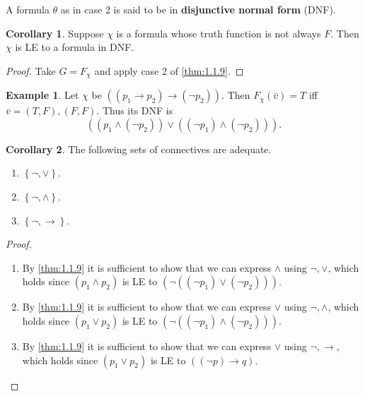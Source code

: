 \documentclass{article}
\newcommand{\rb}[1]{\left( #1 \right)}
\newcommand{\cb}[1]{\left\{ #1 \right\}}
\newcommand{\notb}[1]{\rb{\neg #1}}
\newcommand{\orb}[2]{\rb{#1 \lor #2}}
\newcommand{\andb}[2]{\rb{#1 \land #2}}
\newcommand{\impb}[2]{\rb{#1 \rightarrow #2}}
\theoremstyle{definition}\newtheorem{definition}{Definition}[subsection]
\theoremstyle{definition}\newtheorem{remark}[definition]{Remark}
\theoremstyle{definition}\newtheorem*{example}{Example}
\theoremstyle{definition}\newtheorem*{note}{Note}
\newtheorem{corollary}[definition]{Corollary}
\begin{document}
A formula $ \theta $ as in case 2 is said to be in \textbf{disjunctive normal form} (DNF).

\begin{corollary}
Suppose $ \chi $ is a formula whose truth function is not always $ F $. Then $ \chi $ is LE to a formula in DNF.
\end{corollary}

\begin{proof}
Take $ G = F_\chi $ and apply case 2 of \ref{thm:1.1.9}.
\end{proof}

\begin{example}
Let $ \chi $ be $ \impb{\impb{p_1}{p_2}}{\notb{p_2}} $. Then $ F_\chi\rb{\bar{v}} = T $ iff $ \bar{v} = \rb{T, F}, \rb{F, F} $. Thus its DNF is
$$ \orb{\andb{p_1}{\notb{p_2}}}{\andb{\notb{p_1}}{\notb{p_2}}}. $$
\end{example}

\begin{corollary}
The following sets of connectives are adequate.
\begin{enumerate}
\item $ \cb{\neg, \lor} $.
\item $ \cb{\neg, \land} $.
\item $ \cb{\neg, \rightarrow} $.
\end{enumerate}
\end{corollary}

\begin{proof}
\hfill
\begin{enumerate}
\item By \ref{thm:1.1.9} it is sufficient to show that we can express $ \land $ using $ \neg, \lor $, which holds since $ \andb{p_1}{p_2} $ is LE to $ \notb{\orb{\notb{p_1}}{\notb{p_2}}} $.
\item By \ref{thm:1.1.9} it is sufficient to show that we can express $ \lor $ using $ \neg, \land $, which holds since $ \orb{p_1}{p_2} $ is LE to $ \notb{\andb{\notb{p_1}}{\notb{p_2}}} $.
\item By \ref{thm:1.1.9} it is sufficient to show that we can express $ \lor $ using $ \neg, \rightarrow $, which holds since $ \orb{p_1}{p_2} $ is LE to $ \impb{\notb{p}}{q} $.
\end{enumerate}
\end{proof}

\end{document}
